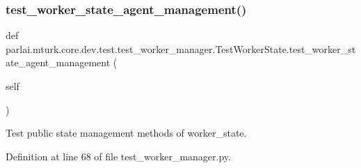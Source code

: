 \subsubsection{\texorpdfstring{test\+\_\+worker\+\_\+state\+\_\+agent\+\_\+management()}{test\_worker\_state\_agent\_management()}}
{\footnotesize\ttfamily def parlai.\+mturk.\+core.\+dev.\+test.\+test\+\_\+worker\+\_\+manager.\+Test\+Worker\+State.\+test\+\_\+worker\+\_\+state\+\_\+agent\+\_\+management (\begin{DoxyParamCaption}\item[{}]{self }\end{DoxyParamCaption})}

\begin{DoxyVerb}Test public state management methods of worker_state.
\end{DoxyVerb}
 

Definition at line 68 of file test\+\_\+worker\+\_\+manager.\+py.


